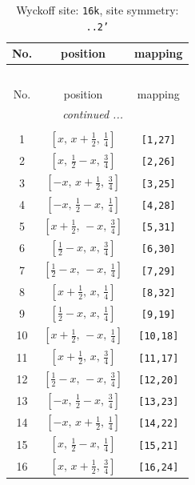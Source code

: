 \documentclass[fleqn,8pt]{jsarticle}
\begin{document}
\begin{longtable}{ccc}
\caption{Wyckoff site: {\tt 16k}, site symmetry: {\tt ..2'}}
 \\
 \hline \hline
No. & position & mapping \\ \hline \endfirsthead

\multicolumn{2}{l}{\tablename\ \thetable{}} \\
 \hline \hline
No. & position & mapping \\ \hline \endhead

 \hline \hline
\multicolumn{2}{r}{\footnotesize\it continued ...} \\ \endfoot

 \hline \hline
\multicolumn{2}{r}{} \\ \endlastfoot

1 & $\left[ x,\, x + \frac{1}{2},\, \frac{1}{4} \right]$ & {\tt [1,27]} \\ \hline
2 & $\left[ x,\, \frac{1}{2} - x,\, \frac{3}{4} \right]$ & {\tt [2,26]} \\ \hline
3 & $\left[ - x,\, x + \frac{1}{2},\, \frac{3}{4} \right]$ & {\tt [3,25]} \\ \hline
4 & $\left[ - x,\, \frac{1}{2} - x,\, \frac{1}{4} \right]$ & {\tt [4,28]} \\ \hline
5 & $\left[ x + \frac{1}{2},\, - x,\, \frac{3}{4} \right]$ & {\tt [5,31]} \\ \hline
6 & $\left[ \frac{1}{2} - x,\, x,\, \frac{3}{4} \right]$ & {\tt [6,30]} \\ \hline
7 & $\left[ \frac{1}{2} - x,\, - x,\, \frac{1}{4} \right]$ & {\tt [7,29]} \\ \hline
8 & $\left[ x + \frac{1}{2},\, x,\, \frac{1}{4} \right]$ & {\tt [8,32]} \\ \hline
9 & $\left[ \frac{1}{2} - x,\, x,\, \frac{1}{4} \right]$ & {\tt [9,19]} \\ \hline
10 & $\left[ x + \frac{1}{2},\, - x,\, \frac{1}{4} \right]$ & {\tt [10,18]} \\ \hline
11 & $\left[ x + \frac{1}{2},\, x,\, \frac{3}{4} \right]$ & {\tt [11,17]} \\ \hline
12 & $\left[ \frac{1}{2} - x,\, - x,\, \frac{3}{4} \right]$ & {\tt [12,20]} \\ \hline
13 & $\left[ - x,\, \frac{1}{2} - x,\, \frac{3}{4} \right]$ & {\tt [13,23]} \\ \hline
14 & $\left[ - x,\, x + \frac{1}{2},\, \frac{1}{4} \right]$ & {\tt [14,22]} \\ \hline
15 & $\left[ x,\, \frac{1}{2} - x,\, \frac{1}{4} \right]$ & {\tt [15,21]} \\ \hline
16 & $\left[ x,\, x + \frac{1}{2},\, \frac{3}{4} \right]$ & {\tt [16,24]} \\
\end{longtable}
\end{document}
